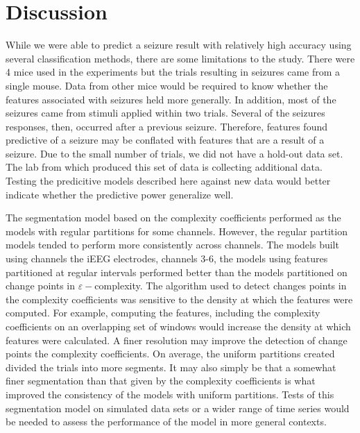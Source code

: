 \section{Discussion} 

While we were able to predict a seizure result 
with relatively high accuracy using several 
classification methods, there are some 
limitations to the study. There were 4 mice 
used in the experiments but the 
trials resulting in seizures came from a single mouse.
Data from other mice would be 
required to know whether the features associated 
with seizures held more generally. In addition, 
most of the seizures 
came from stimuli applied within two trials. 
Several of the seizures responses, then, 
occurred after a previous seizure. 
Therefore, features found predictive of a seizure may  
be conflated with features that are a result of a seizure. 
Due to the small number of trials, we did not 
have a hold-out data set. The lab from which produced this 
set of data is collecting additional data.  
Testing the predicitive models described here against 
new data would better indicate whether the predictive power 
generalize well.

The segmentation model based on the complexity coefficients performed as the models with regular partitions for some channels.  However, the regular partition models tended to perform more consistently across channels. The models built using channels 
the iEEG electrodes, channels 3-6, the models using features 
partitioned at regular intervals performed better than the 
models partitioned on change points in
$\varepsilon-$complexity. The algorithm used to detect
changes points in the complexity coefficients was sensitive to 
the density at which the features were computed. For example, 
computing the features, including the complexity coefficients 
on an overlapping set of windows would increase the density at 
which features were calculated. A finer resolution may 
improve the detection of change points the complexity coefficients. 
On average, the uniform partitions created divided the 
trials into more segments. It may also simply be that a somewhat 
finer segmentation than that given by the complexity coefficients
is what improved the consistency of the models with uniform 
partitions. 
Tests of this segmentation model on simulated data sets or a wider range of time series would be needed to assess the performance of the model in more general contexts.  


